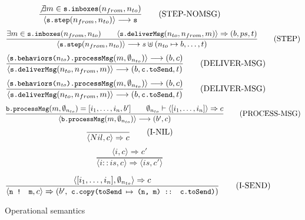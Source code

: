 \begin{figure}[!h]
\label{fig:opsem}
\begin{framed}
 
\begin{equation}
\dfrac{
  \not\exists m \in \texttt{\small{s.inboxes}}(n_{from}, n_{to})
}{
  \langle \texttt{\small{s.step}}(n_{from}, n_{to}) \rangle \longrightarrow \texttt{\small{s}}
}
\tag{STEP-NOMSG}
\end{equation}
\vspace{10pt}
\begin{equation}
\dfrac{
  \exists m \in \texttt{\small{s.inboxes}}(n_{from}, n_{to}) \qquad
  \langle \texttt{\small{s.deliverMsg}}(n_{to}, n_{from}, m) \rangle \Rightarrow (b, ps, t)
}{
  \langle \texttt{\small{s.step}}(n_{from}, n_{to}) \rangle \longrightarrow s \uplus (n_{to} \mapsto b, \ldots, t)
}
\tag{STEP}
\end{equation}
\vspace{10pt}
\begin{equation}
\dfrac{
  \langle \texttt{\small{s.behaviors($n_{to}$).processMsg}}(m, \emptyset_{n_{to}}) \rangle \longrightarrow (b, c) 
}{
   \langle \texttt{\small{s.deliverMsg}}(n_{to}, n_{from}, m) \rangle \longrightarrow (b, \texttt{\small{c.toSend}}, t)
}
\tag{DELIVER-MSG}
\end{equation}
\vspace{10pt}
\begin{equation}
\dfrac{
  \langle \texttt{\small{s.behaviors($n_{to}$).processMsg}}(m, \emptyset_{n_{to}}) \rangle \longrightarrow (b, c) 
}{
   \langle \texttt{\small{s.deliverMsg}}(n_{to}, n_{from}, m) \rangle \longrightarrow (b, \texttt{\small{c.toSend}}, t)
}
\tag{DELIVER-MSG}
\end{equation}
\vspace{10pt}
\begin{equation}
\dfrac{
  \texttt{\small{b.processMsg}}(m, \emptyset_{n_{to}}) = [i_1, \ldots, i_n, b'] \qquad
  \emptyset_{n_{to}} \vdash \langle [i_1, \ldots, i_n] \rangle \Rightarrow c
}{
   \langle \texttt{\small{b.processMsg}}(m, \emptyset_{n_{to}}) \rangle \longrightarrow (b', c)
}
\tag{PROCESS-MSG}
\end{equation}
\vspace{10pt}
\begin{equation}
\dfrac{\empty}{
   \langle Nil, c \rangle \Rightarrow c
}
\tag{I-NIL}
\end{equation}
\vspace{10pt}
\begin{equation}
\dfrac{
  \langle i, c \rangle \Rightarrow c'
}{
  \langle i :: is, c \rangle \Rightarrow \langle is, c' \rangle
}
\tag{I-CONS}
\end{equation}

\vspace{10pt}
\begin{equation}
\dfrac{
  \langle [i_1, \ldots, i_n], \emptyset_{n_{to}} \rangle \Rightarrow c
}{
   \langle \texttt{\small{n ! m}}, c \rangle \Rightarrow (b',\ \texttt{\small{c.copy(toSend $\mapsto$ (n, m) :: c.toSend)}})
}
\tag{I-SEND}
\end{equation}

\end{framed}
\vspace{-10pt}
\caption{Operational semantics}
\end{figure}

